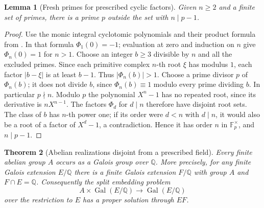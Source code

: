 \documentclass[11pt,oneside,openany]{book}
\newtheorem{theorem}{Theorem}[chapter]
\newtheorem{lemma}[theorem]{Lemma}
\theoremstyle{definition}
\theoremstyle{remark}
\begin{document}
\begin{lemma}[Fresh primes for prescribed cyclic factors]
\label{res:IG15}
Given \(n\geq2\) and a finite set of primes, there is a prime
\(p\) outside the set with \(n\mid p-1\).
\end{lemma}

\begin{proof}
Use the monic integral cyclotomic polynomials and their product
formula from \cite[Result K07.15.cyclotomic\_polynomials]{mg-d07}.
In that formula \(\Phi_1(0)=-1\); evaluation at zero and induction
on \(n\) give \(\Phi_n(0)=1\) for \(n>1\).
Choose an integer \(b\geq3\) divisible by \(n\) and all the
excluded primes. Since each primitive complex \(n\)-th root
\(\xi\) has modulus \(1\), each factor \(|b-\xi|\) is at least
\(b-1\). Thus \(|\Phi_n(b)|>1\). Choose a prime divisor \(p\)
of \(\Phi_n(b)\); it does not divide \(b\), since
\(\Phi_n(b)\equiv 1\) modulo every prime dividing \(b\).
In particular \(p\nmid n\). Modulo \(p\) the polynomial
\(X^n-1\) has no repeated root, since its derivative is
\(nX^{n-1}\). The factors \(\Phi_d\) for \(d\mid n\) therefore
have disjoint root sets. The class of \(b\) has \(n\)-th power
one; if its order were \(d<n\) with \(d\mid n\), it would
also be a root of a factor of \(X^d-1\), a contradiction.
Hence it has order \(n\) in \(\mathbb F_p^\times\), and
\(n\mid p-1\).
\end{proof}

\begin{theorem}[Abelian realizations disjoint from a prescribed field]
\label{res:IG16}
Every finite abelian group \(A\) occurs as a Galois group over
\(\mathbb Q\). More precisely, for any finite Galois extension
\(E/\mathbb Q\) there is a finite Galois extension \(F/\mathbb Q\)
with group \(A\) and \(F\cap E=\mathbb Q\). Consequently the
split embedding problem
\[
   A\times\operatorname{Gal}(E/\mathbb Q)
             \longrightarrow \operatorname{Gal}(E/\mathbb Q)
\]
over the restriction to \(E\) has a proper solution through \(EF\).
\end{theorem}
\end{document}
